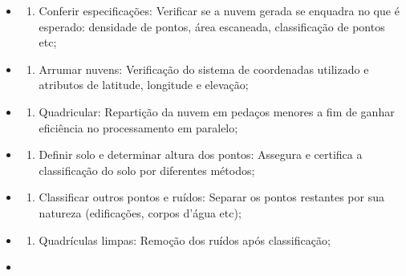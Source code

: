 \documentclass[
]{article}
\providecommand{\tightlist}{%
  \setlength{\itemsep}{0pt}\setlength{\parskip}{0pt}}
\begin{document}
\begin{itemize}
\tightlist
\item
  \begin{enumerate}
  \def\labelenumi{\arabic{enumi}.}
  \tightlist
  \item
    Conferir especificações: Verificar se a nuvem gerada se enquadra no
    que é esperado: densidade de pontos, área escaneada, classificação
    de pontos etc;
  \end{enumerate}
\item
  \begin{enumerate}
  \def\labelenumi{\arabic{enumi}.}
  \setcounter{enumi}{1}
  \tightlist
  \item
    Arrumar nuvens: Verificação do sistema de coordenadas utilizado e
    atributos de latitude, longitude e elevação;
  \end{enumerate}
\item
  \begin{enumerate}
  \def\labelenumi{\arabic{enumi}.}
  \setcounter{enumi}{2}
  \tightlist
  \item
    Quadricular: Repartição da nuvem em pedaços menores a fim de ganhar
    eficiência no processamento em paralelo;
  \end{enumerate}
\item
  \begin{enumerate}
  \def\labelenumi{\arabic{enumi}.}
  \setcounter{enumi}{3}
  \tightlist
  \item
    Definir solo e determinar altura dos pontos: Assegura e certifica a
    classificação do solo por diferentes métodos;
  \end{enumerate}
\item
  \begin{enumerate}
  \def\labelenumi{\arabic{enumi}.}
  \setcounter{enumi}{4}
  \tightlist
  \item
    Classificar outros pontos e ruídos: Separar os pontos restantes por
    sua natureza (edificações, corpos d'água etc);
  \end{enumerate}
\item
  \begin{enumerate}
  \def\labelenumi{\arabic{enumi}.}
  \setcounter{enumi}{5}
  \tightlist
  \item
    Quadrículas limpas: Remoção dos ruídos após classificação;
  \end{enumerate}
\item
  \begin{enumerate}
  \def\labelenumi{\arabic{enumi}.}
  \setcounter{enumi}{6}

\end{enumerate}
\end{itemize}
\end{document}
